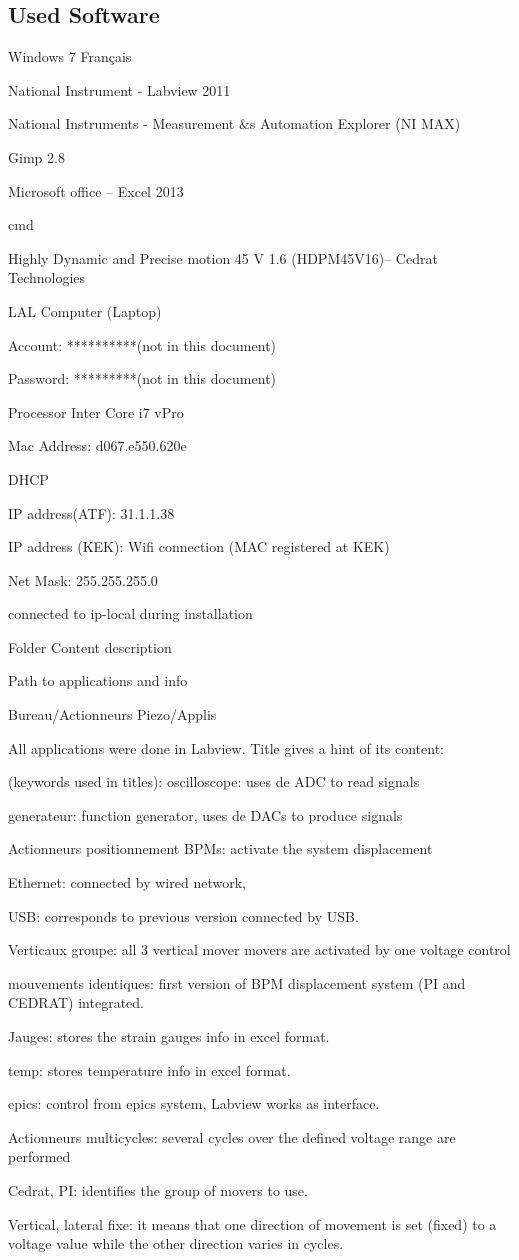 \documentclass[a4paper,11pt]{book}
\begin{document}
\subsection{Used Software}
Windows 7 Français\par
National Instrument - Labview 2011\par
National Instruments - Measurement $\&$s Automation Explorer (NI MAX)\par
Gimp 2.8\par
Microsoft office – Excel 2013\par
cmd\par
Highly Dynamic and Precise motion 45 V 1.6 (HDPM45V16)– Cedrat Technologies\par
LAL Computer (Laptop)\par
Account: **********(not in this document)\par
Password: *********(not in this document)\par
Processor Inter Core i7 vPro\par
Mac Address: d067.e550.620e\par
DHCP\par
IP address(ATF): 31.1.1.38\par
IP address (KEK): Wifi connection (MAC registered at KEK)\par
Net Mask: 255.255.255.0\par
connected to ip-local during installation\par
Folder Content description\par
Path to applications and info\par
Bureau/Actionneurs Piezo/Applis\par
All applications were done in Labview. Title gives a hint of its content:\par
	(keywords used in titles):
oscilloscope: uses de ADC to read signals\par
generateur: function generator, uses de DACs to produce signals\par
Actionneurs positionnement BPMs: activate the system displacement\par
Ethernet: connected by wired network,\par
USB: corresponds to previous version connected by USB.\par
Verticaux groupe: all 3 vertical mover movers are activated by one voltage control\par
 mouvements identiques: first version of BPM displacement system (PI and CEDRAT) integrated.\par
Jauges: stores the strain gauges info in excel format.\par
temp: stores temperature info in excel format.\par
epics: control from epics system, Labview works as interface.\par
Actionneurs multicycles: several cycles over the defined voltage range are performed\par
Cedrat, PI: identifies the group of movers to use.\par
Vertical, lateral fixe: it means that one direction of movement is set (fixed) to a voltage value while the other direction varies in cycles.\par
\end{document}
